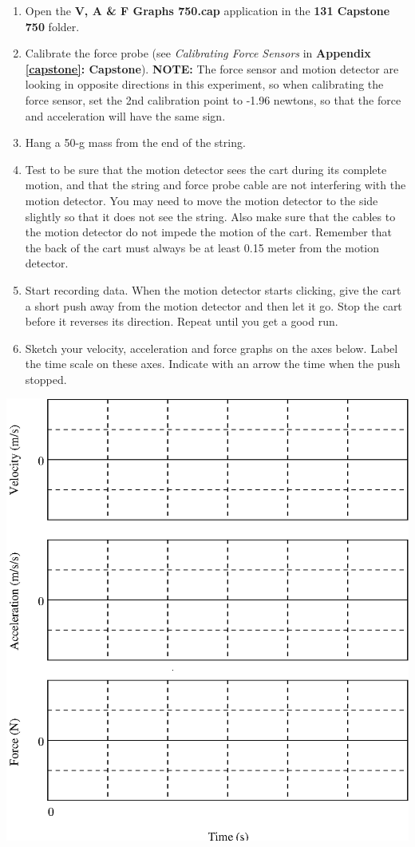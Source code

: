 \begin{enumerate}
\item Open the \textbf{V, A \& F Graphs 750.cap} application in the \textbf{131 Capstone 750} folder.
\item Calibrate the force probe (see \textit{Calibrating Force Sensors} in \textbf{Appendix \ref{capstone}: Capstone}).
\textbf{NOTE:} The force sensor and motion detector are looking in opposite directions in 
this experiment, so when calibrating the force sensor, set the 2nd calibration point to -1.96 
newtons, so that the force and acceleration will have the same sign.
\item Hang a 50-g mass from the end of the string.
\item Test to be sure that the motion detector sees the cart during its complete motion,
and that the string and force probe cable are not interfering with the motion
detector. You may need to move the motion detector to the side slightly so that
it does not see the string. Also make sure that the cables to the motion detector
do not impede the motion of the cart. Remember that the back of the cart must
always be at least 0.15 meter from the motion detector. 
\item Start recording data. When the motion detector starts clicking, give the cart
a short push away from the motion detector and then let it go. Stop the cart
before it reverses its direction. Repeat until you get a good run. 
\item Sketch your velocity, acceleration and force graphs on the axes below. Label
the time scale on these axes. Indicate with an arrow the time when the push
stopped.
\end{enumerate}
\vspace{0.3cm}
{\par\centering \includegraphics{force2/force2_fig4.eps} \par}
\vspace{0.3cm}

